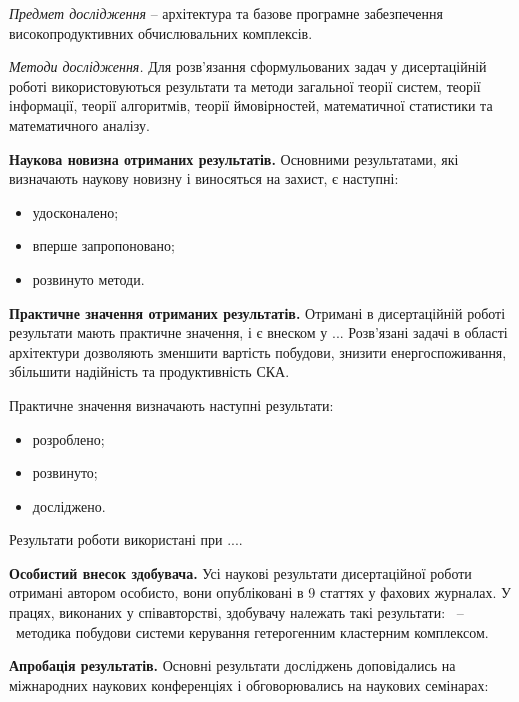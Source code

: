 \textit{Предмет дослідження} -- архітектура та базове програмне забезпечення високопродуктивних обчислювальних комплексів.

\textit{Методи дослідження.} Для розв'язання сформульованих задач у дисертаційній роботі використовуються результати та методи загальної теорії систем, теорії інформації, теорії алгоритмів, теорії ймовірностей, математичної статистики та математичного аналізу.

\textbf{Наукова новизна отриманих результатів.}
Основними результатами, які визначають наукову новизну і виносяться на захист, є наступні:

\begin{itemize}
\item удосконалено;
\item вперше запропоновано;
\item розвинуто методи.
\end{itemize}


\textbf{Практичне значення отриманих результатів.}
Отримані в дисертаційній роботі результати мають практичне значення, і є внеском у ... Розв'язані задачі в області архітектури дозволяють зменшити вартість побудови, знизити енергоспоживання, збільшити надійність та продуктивність СКА.

Практичне значення визначають наступні результати:

\begin{itemize}
\item розроблено; 
\item розвинуто;
\item досліджено.
\end{itemize}

Результати роботи використані при ....

\nocite{getero-art,getero-taganrog-art,supercomp-architecture-art,security-art,boib-art,srp-art,portal-art,web,web-portal} 
\nocite{supercomp-architecture-proceed,policy,50anniv-art,steking,cluster-grid-management-system,cluster-stats,transport,web-portal-abrau,hpcua-scheduling,hpcua-gpu,scms-congress2011}

\textbf{Особистий внесок здобувача.}
Усі наукові результати дисертаційної роботи отримані автором особисто, вони опубліковані в 9 статтях у фахових журналах. У працях, виконаних у співавторстві, здобувачу належать такі результати: \cite{getero-art,getero-taganrog-art}~--~методика побудови системи керування гетерогенним кластерним комплексом.


\textbf{Апробація результатів.}
Основні результати досліджень доповідались на міжнародних наукових конференціях і обговорювались на наукових семінарах: 


